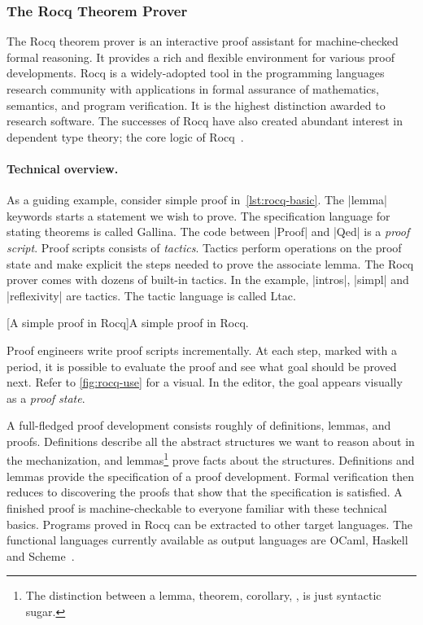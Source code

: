 \subsubsection{The Rocq Theorem Prover}
\label{subsec:rocq}

The Rocq theorem prover is an interactive proof assistant for machine-checked formal reasoning.
It provides a rich and flexible environment for various proof developments.
Rocq is a widely-adopted tool in the programming languages research community with applications in formal assurance of mathematics, semantics, and program verification.
It is the highest distinction awarded to research software.
The successes of Rocq have also created abundant interest in dependent type theory;
the core logic of Rocq~\cite{coquand1988}.

\paragraph*{Technical overview.}
As a guiding example, consider simple proof in~\autoref{lst:rocq-basic}.
The \pr|lemma| keywords starts a statement we wish to prove.
The specification language for stating theorems is called Gallina.
The code between \pr|Proof| and \pr|Qed| is a \emph{proof script}.
Proof scripts consists of \emph{tactics}.
Tactics perform operations on the proof state and make explicit the steps needed to prove the associate lemma.
The Rocq prover comes with dozens of built-in tactics.
In the example, \pr|intros|, \pr|simpl| and \pr|reflexivity| are tactics.
The tactic language is called Ltac.

\begin{center}
\begin{minipage}{\textwidth}
\captionsetup{type=lstlisting}
[A simple proof in Rocq]{A simple proof in Rocq.}
\label{lst:rocq-basic}
\end{minipage}
\end{center}

Proof engineers write proof scripts incrementally.
At each step, marked with a period, it is possible to evaluate the proof and see what goal should be proved next.
Refer to \autoref{fig:rocq-use} for a visual.
In the editor, the goal appears visually as a \emph{proof state}.

A full-fledged proof development consists roughly of definitions, lemmas, and proofs.
Definitions describe all the abstract structures we want to reason about in the mechanization,
and lemmas\footnote{The distinction between a lemma, theorem, corollary, \etc, is just syntactic sugar.}
prove facts about the structures.
Definitions and lemmas provide the specification of a proof development.
Formal verification then reduces to discovering the proofs that show that the specification is satisfied.
A finished proof is machine-checkable to everyone familiar with these technical basics.
Programs proved in Rocq can be extracted to other target languages.
The functional languages currently available as output languages are
OCaml, Haskell and Scheme~\cite{rocqdoc}.

